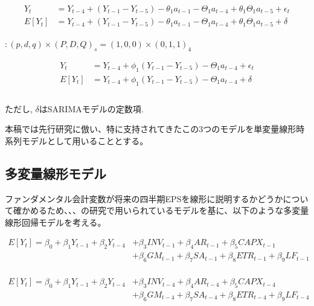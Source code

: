 \documentclass[a4paper, 12pt]{jsreport}
\begin{document}
\begin{equation}
  \begin{split}
    Y_t &= Y_{t-4} + (Y_{t-1} - Y_{t-5}) - \theta_1a_{t-1} - \Theta_1a_{t-4} + \theta_1\Theta_1a_{t-5} + \epsilon_t \\
    E[Y_t] &= Y_{t-4} + (Y_{t-1} - Y_{t-5}) - \theta_1a_{t-1} - \Theta_1a_{t-4} + \theta_1\Theta_1a_{t-5} + \delta \\
  \end{split}
\end{equation}

\cite*{brown1979univariate} $: (p, d, q) \times (P, D, Q)_s = (1, 0, 0) \times (0, 1, 1)_4$

\begin{equation}
  \begin{split}    
    Y_t &= Y_{t-4} + \phi_1(Y_{t-1}-Y_{t-5}) - \Theta_1a_{t-4} + \epsilon_t \\
    E[Y_t] &= Y_{t-4} + \phi_1(Y_{t-1}-Y_{t-5}) - \Theta_1a_{t-4} + \delta \\
    \\
  \end{split}
\end{equation}

ただし, $\delta$はSARIMAモデルの定数項.

本稿では先行研究に倣い、特に支持されてきたこの3つのモデルを単変量線形時系列モデルとして用いることとする。

\subsection{多変量線形モデル}

ファンダメンタル会計変数が将来の四半期EPSを線形に説明するかどうかについて確かめるため、\cite*{lev1993fundamental}、\cite*{abarbanell1997fundamental}、\cite*{lorek1996multivariate}の研究で用いられているモデルを基に、以下のような多変量線形回帰モデルを考える。

\begin{equation}
  \begin{split}
    \label{mlm1}
    E[Y_t] = \beta_0 + \beta_1Y_{t-1} + \beta_2Y_{t-4} 
    &+ \beta_3INV_{t-1} + \beta_4AR_{t-1} + \beta_5CAPX_{t-1} \\
    &+ \beta_6GM_{t-1} + \beta_7SA_{t-1} + \beta_8ETR_{t-1} + \beta_9LF_{t-1} \\
  \end{split}
\end{equation}

\begin{equation}
  \begin{split}
    \label{mlm2}
    E[Y_t] = \beta_0 + \beta_1Y_{t-1} + \beta_2Y_{t-4} 
    &+ \beta_3INV_{t-4} + \beta_4AR_{t-4} + \beta_5CAPX_{t-4} \\
    &+ \beta_6GM_{t-4} + \beta_7SA_{t-4} + \beta_8ETR_{t-4} + \beta_9LF_{t-4} \\
  \end{split}
\end{equation}
\end{document}
